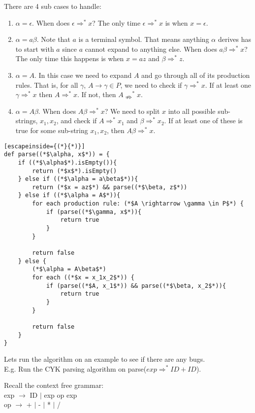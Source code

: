 \documentclass[12pt, letterpaper]{article}
\begin{document}
There are 4 sub cases to handle:
\begin{enumerate}
\item \(\alpha = \epsilon\). When does \(\epsilon \Rightarrow^* x\)? The only time \(\epsilon\Rightarrow^* x\) is when \(x = \epsilon\).
\item \(\alpha = a\beta\). Note that \(a\) is a terminal symbol. That means anything \(\alpha\) derives has to start with \(a\) since \(a\) cannot expand to anything else. When does \(a\beta \Rightarrow^* x\)? The only time this happens is when \(x = az\) and \(\beta \Rightarrow^* z\).
\item \(\alpha = A\). In this case we need to expand \(A\) and go through all of its production rules. That is, for all \(\gamma\), \(A \rightarrow \gamma \in P\), we need to check if \(\gamma \Rightarrow^* x\). If at least one \(\gamma \Rightarrow^* x\) then \(A \Rightarrow^* x\). If not, then \(A \nRightarrow^* x\).
\item \(\alpha = A\beta\). When does \(A\beta \Rightarrow^* x\)? We need to split \(x\) into all possible sub-strings, \(x_1, x_2\), and check if \(A \Rightarrow^* x_1\) and \(\beta \Rightarrow^* x_2\). If at least one of these is true for some sub-string \(x_1, x_2\), then \(A\beta \Rightarrow^* x\).
\end{enumerate}

\begin{lstlisting}[escapeinside={(*}{*)}]
def parse((*$\alpha, x$*)) = {
	if ((*$\alpha$*).isEmpty()){
		return (*$x$*).isEmpty()
	} else if ((*$\alpha = a\beta$*)){
		return (*$x = az$*) && parse((*$\beta, z$*))
	} else if ((*$\alpha = A$*)){
		for each production rule: (*$A \rightarrow \gamma \in P$*) {
			if (parse((*$\gamma, x$*)){
				return true
			}
		}
		
		return false
	} else {
		(*$\alpha = A\beta$*)
		for each ((*$x = x_1x_2$*)) {
			if (parse((*$A, x_1$*)) && parse((*$\beta, x_2$*)){
				return true
			}
		}
		
		return false
	}
}
\end{lstlisting}

Lets run the algorithm on an example to see if there are any bugs.\\

E.g. Run the CYK parsing algorithm on parse(\(exp \Rightarrow^* ID + ID\)).

Recall the context free grammar:\\

exp \(\rightarrow\) ID \(\vert\) exp op exp\\
op \(\rightarrow\) + \(\vert\) - \(\vert\) * \(\vert\) /
\end{document}
